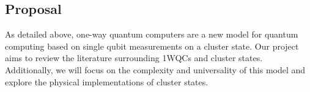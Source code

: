 \documentclass[twocolumn]{IEEEtran11}
\begin{document}
\subsection{Proposal}
As detailed above, one-way quantum computers are a new model for quantum computing based on single qubit measurements on a cluster state. Our project aims to review the literature surrounding 1WQCs and cluster states. Additionally, we will focus on the complexity and universality of this model and explore the physical implementations of cluster states. 



\end{document}
